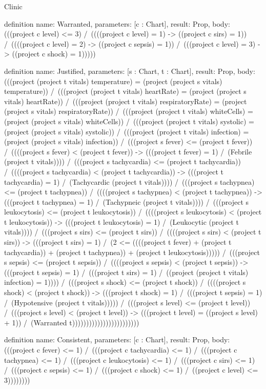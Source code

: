 \begin{lexlean}{Clinic}
\begin{semanticmodule}
definition{
  name: Warranted,
  parameters: [c : Chart],
  result: Prop,
  body: (((project c level) <= 3) /\ ((((project c level) = 1) -> ((project c sirs) = 1)) /\ ((((project c level) = 2) -> ((project c sepsis) = 1)) /\ (((project c level) = 3) -> ((project c shock) = 1)))))
}

definition{
  name: Justified,
  parameters: [s : Chart, t : Chart],
  result: Prop,
  body: (((project (project t vitals) temperature) = (project (project s vitals) temperature)) /\ (((project (project t vitals) heartRate) = (project (project s vitals) heartRate)) /\ (((project (project t vitals) respiratoryRate) = (project (project s vitals) respiratoryRate)) /\ (((project (project t vitals) whiteCells) = (project (project s vitals) whiteCells)) /\ (((project (project t vitals) systolic) = (project (project s vitals) systolic)) /\ (((project (project t vitals) infection) = (project (project s vitals) infection)) /\ (((project s fever) <= (project t fever)) /\ ((((project s fever) < (project t fever)) -> (((project t fever) = 1) /\ (Febrile (project t vitals)))) /\ (((project s tachycardia) <= (project t tachycardia)) /\ ((((project s tachycardia) < (project t tachycardia)) -> (((project t tachycardia) = 1) /\ (Tachycardic (project t vitals)))) /\ (((project s tachypnea) <= (project t tachypnea)) /\ ((((project s tachypnea) < (project t tachypnea)) -> (((project t tachypnea) = 1) /\ (Tachypneic (project t vitals)))) /\ (((project s leukocytosis) <= (project t leukocytosis)) /\ ((((project s leukocytosis) < (project t leukocytosis)) -> (((project t leukocytosis) = 1) /\ (Leukocytic (project t vitals)))) /\ (((project s sirs) <= (project t sirs)) /\ ((((project s sirs) < (project t sirs)) -> (((project t sirs) = 1) /\ (2 <= ((((project t fever) + (project t tachycardia)) + (project t tachypnea)) + (project t leukocytosis))))) /\ (((project s sepsis) <= (project t sepsis)) /\ ((((project s sepsis) < (project t sepsis)) -> (((project t sepsis) = 1) /\ (((project t sirs) = 1) /\ ((project (project t vitals) infection) = 1)))) /\ (((project s shock) <= (project t shock)) /\ ((((project s shock) < (project t shock)) -> (((project t shock) = 1) /\ (((project t sepsis) = 1) /\ (Hypotensive (project t vitals))))) /\ (((project s level) <= (project t level)) /\ (((project s level) < (project t level)) -> (((project t level) = ((project s level) + 1)) /\ (Warranted t))))))))))))))))))))))))
}

definition{
  name: Consistent,
  parameters: [c : Chart],
  result: Prop,
  body: (((project c fever) <= 1) /\ (((project c tachycardia) <= 1) /\ (((project c tachypnea) <= 1) /\ (((project c leukocytosis) <= 1) /\ (((project c sirs) <= 1) /\ (((project c sepsis) <= 1) /\ (((project c shock) <= 1) /\ ((project c level) <= 3))))))))
}


\end{semanticmodule}
\end{lexlean}
